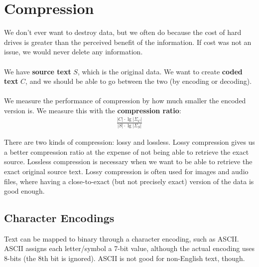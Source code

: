 \documentclass[]{article}
\theoremstyle{definition}
\begin{document}
	\section{Compression}
		We don't ever want to destroy data, but we often do because the cost of hard drives is greater than the perceived benefit of the information. If cost was not an issue, we would never delete any information.
		\\ \\
		We have \textbf{source text} $S$, which is the original data. We want to create \textbf{coded text} $C$, and we should be able to go between the two (by encoding or decoding).
		\\ \\
		We measure the performance of compression by how much smaller the encoded version is. We measure this with the \textbf{compression ratio}:
		\begin{align*}
			\frac{|C| \cdot \lg |\Sigma_C|}{|S| \cdot \lg |\Sigma_S|}
		\end{align*}

		There are two kinds of compression: lossy and lossless. Lossy compression gives us a better compression ratio at the expense of not being able to retrieve the exact source. Lossless compression is necessary when we want to be able to retrieve the exact original source text. Lossy compression is often used for images and audio files, where having a close-to-exact (but not precisely exact) version of the data is good enough.

		\subsection{Character Encodings}
			Text can be mapped to binary through a character encoding, such as ASCII. ASCII assigns each letter/symbol a 7-bit value, although the actual encoding uses 8-bits (the 8th bit is ignored). ASCII is not good for non-English text, though.
\end{document}
